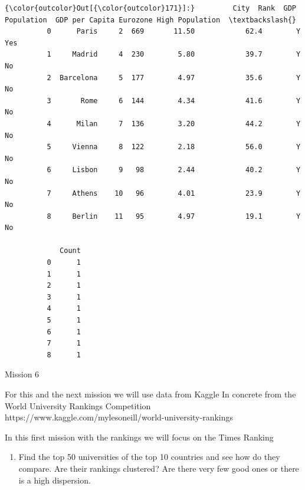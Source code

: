 \documentclass[11pt]{article}
\providecommand{\tightlist}{%
      \setlength{\itemsep}{0pt}\setlength{\parskip}{0pt}}
\begin{document}
\begin{Verbatim}[commandchars=\\\{\}]
{\color{outcolor}Out[{\color{outcolor}171}]:}         City  Rank  GDP  Population  GDP per Capita Eurozone High Population  \textbackslash{}
          0      Paris     2  669       11.50            62.4        Y             Yes   
          1     Madrid     4  230        5.80            39.7        Y              No   
          2  Barcelona     5  177        4.97            35.6        Y              No   
          3       Rome     6  144        4.34            41.6        Y              No   
          4      Milan     7  136        3.20            44.2        Y              No   
          5     Vienna     8  122        2.18            56.0        Y              No   
          6     Lisbon     9   98        2.44            40.2        Y              No   
          7     Athens    10   96        4.01            23.9        Y              No   
          8     Berlin    11   95        4.97            19.1        Y              No   
          
             Count  
          0      1  
          1      1  
          2      1  
          3      1  
          4      1  
          5      1  
          6      1  
          7      1  
          8      1  
\end{Verbatim}
            
    Mission 6

For this and the next mission we will use data from Kaggle In concrete
from the World University Rankings Competition
https://www.kaggle.com/mylesoneill/world-university-rankings

In this first mission with the rankings we will focus on the Times
Ranking

\begin{enumerate}
\def\labelenumi{\alph{enumi})}
\tightlist
\item
  Find the top 50 universities of the top 10 countries and see how do
  they compare. Are their rankings clustered? Are there very few good
  ones or there is a high dispersion. 
\end{enumerate}
\end{document}

